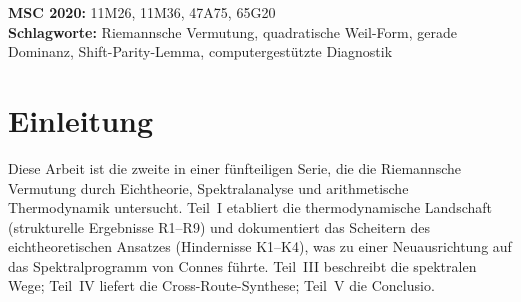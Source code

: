 ﻿\documentclass[12pt,a4paper]{article}
\theoremstyle{definition}
\theoremstyle{remark}
\begin{document}
\begin{abstract}
\medskip\noindent
\textbf{Strukturelles Update (v3.0, 2026-05-26).}
Die Serie wird von einer Trilogie auf eine fünfteilige Serie umstrukturiert; der bedingte Reduktionsstatus von v2.2 bleibt unverändert. Eine neue  stellt den GF1-Boundary-Moment-Benchmark $\mathrm{sLI} \sim (64\pi^2/3)\,\lambda/(NL)$ für den konvergierten $\lambda=5,7$-Benchmark vor, behandelt den Niedrig-$\lambda$-Ausreißer $\lambda=3$ separat und lässt $\lambda=11$ als offenen Diskriminator stehen.

\medskip\noindent
\textbf{Strict-Review-Update (v3.1, 2026-06-29).}
Die N1-Arbeit mit shifted inverses wird hier nicht als Grundzustandszertifikat
verwendet: Für $B_\lambda=(A_\lambda+MI)^{-1}$ kehrt die Spektralkarte die
Ordnung um, so dass der Grundzustand von $A_\lambda$ dem größten isolierten
$B_\lambda$-Eigenwert entspricht, nicht dem kleinsten. Die finiten CAP- und
Direct-Frontier-Diagnostiken unten bleiben bedingte Legacy-/Variationsevidenz,
bis sie im korrigierten Connes--van-Suijlekom-$U_n$-Rahmen mit validierter
Odd-Sektor-Unterschranke erneut durchgeführt sind.
\end{abstract}

{\small
\noindent\textbf{MSC 2020:} 11M26, 11M36, 47A75, 65G20\\
\textbf{Schlagworte:} Riemannsche Vermutung, quadratische Weil-Form, gerade Dominanz, Shift-Parity-Lemma, computergestützte Diagnostik
}

\clearpage
\tableofcontents
\clearpage

\section{Einleitung}
\label{sec:intro}

Diese Arbeit ist die zweite in einer fünfteiligen Serie, die die Riemannsche Vermutung durch Eichtheorie, Spektralanalyse und arithmetische Thermodynamik untersucht. Teil~I \cite{Geiger2026partI} etabliert die thermodynamische Landschaft (strukturelle Ergebnisse R1--R9) und dokumentiert das Scheitern des eichtheoretischen Ansatzes (Hindernisse K1--K4), was zu einer Neuausrichtung auf das Spektralprogramm von Connes führte. Teil~III \cite{Geiger2026partIII} beschreibt die spektralen Wege; Teil~IV \cite{Geiger2026partIV} liefert die Cross-Route-Synthese; Teil~V \cite{Geiger2026partV} die Conclusio.
\end{document}
